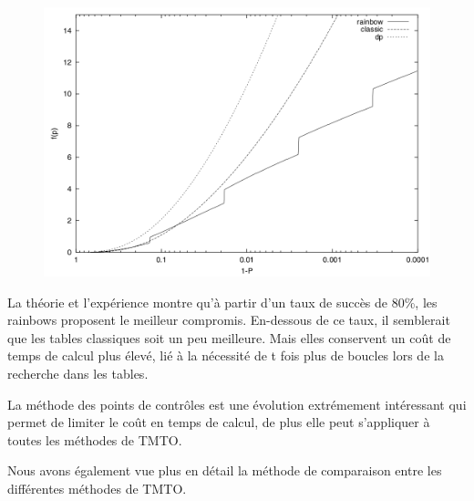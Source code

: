 \begin{figure}[h!]
	\includegraphics[scale=0.25]{other/graph_gamma_P.png}
	\label{fig:TMTO_carac}
\end{figure}

	La théorie et l'expérience montre qu'à partir d'un taux de succès de 80\%, les \glspl{rainbow} proposent le meilleur compromis. En-dessous de ce taux, il semblerait que les tables classiques soit un peu meilleure. Mais elles conservent un coût de temps de calcul plus élevé, lié à la nécessité de t fois plus de boucles lors de la recherche dans les tables.

	La méthode des points de contrôles est une évolution extrémement intéressant qui permet de limiter le coût en temps de calcul, de plus elle peut s'appliquer à toutes les méthodes de \gls{TMTO}.

	\bigskip

	Nous avons également vue plus en détail la méthode de comparaison entre les différentes méthodes de \gls{TMTO}.

\endinput{}
